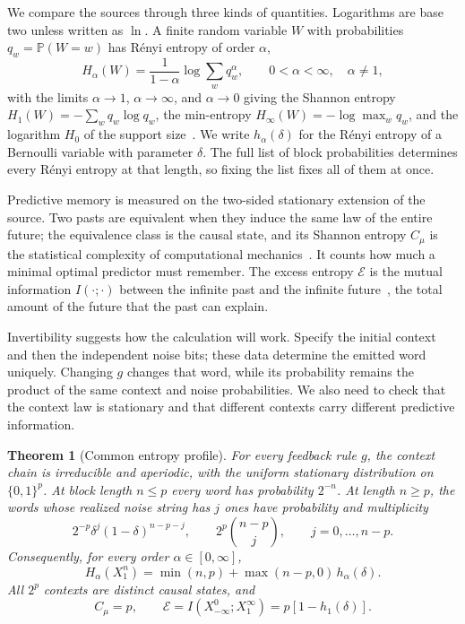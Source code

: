 \documentclass[11pt,a4paper]{article}
\newtheorem{theorem}{Theorem}
\newcommand{\bits}{\{0,1\}}
\newcommand{\PP}{\mathbb{P}}
\begin{document}
We compare the sources through three kinds of quantities. Logarithms are base two unless written as \(\ln\). A finite random variable \(W\) with probabilities \(q_w=\PP(W=w)\) has R\'enyi entropy of order \(\alpha\),
\begin{equation}
H_\alpha(W)=\frac{1}{1-\alpha}\log\sum_w q_w^\alpha,
\qquad 0<\alpha<\infty,\quad\alpha\ne1,
\label{eq:renyi}
\end{equation}
with the limits \(\alpha\to1\), \(\alpha\to\infty\), and \(\alpha\to0\) giving the Shannon entropy \(H_1(W)=-\sum_w q_w\log q_w\), the min-entropy \(H_\infty(W)=-\log\max_w q_w\), and the logarithm \(H_0\) of the support size~\cite{renyi1961measures}. We write \(h_\alpha(\delta)\) for the R\'enyi entropy of a Bernoulli variable with parameter \(\delta\). The full list of block probabilities determines every R\'enyi entropy at that length, so fixing the list fixes all of them at once.

Predictive memory is measured on the two-sided stationary extension of the source. Two pasts are equivalent when they induce the same law of the entire future; the equivalence class is the causal state, and its Shannon entropy \(C_\mu\) is the statistical complexity of computational mechanics~\cite{crutchfield1989inferring,shalizi2001computational}. It counts how much a minimal optimal predictor must remember. The excess entropy \(\mathcal E\) is the mutual information \(I(\cdot;\cdot)\) between the infinite past and the infinite future~\cite{grassberger1986toward,crutchfield2003regularities,bialek2001predictability}, the total amount of the future that the past can explain.

Invertibility suggests how the calculation will work. Specify the initial context and then the independent noise bits; these data determine the emitted word uniquely. Changing \(g\) changes that word, while its probability remains the product of the same context and noise probabilities. We also need to check that the context law is stationary and that different contexts carry different predictive information.

\begin{theorem}[Common entropy profile]
\label{thm:profile}
For every feedback rule \(g\), the context chain is irreducible and aperiodic, with the uniform stationary distribution on \(\bits^p\). At block length \(n\le p\) every word has probability \(2^{-n}\). At length \(n\ge p\), the words whose realized noise string has \(j\) ones have probability and multiplicity
\begin{equation}
2^{-p}\delta^j(1-\delta)^{n-p-j},
\qquad
2^p\binom{n-p}{j},
\qquad j=0,\ldots,n-p.
\label{eq:spectrum}
\end{equation}
Consequently, for every order \(\alpha\in[0,\infty]\),
\begin{equation}
H_\alpha(X_1^n)=\min(n,p)+\max(n-p,0)\,h_\alpha(\delta).
\label{eq:profile}
\end{equation}
All \(2^p\) contexts are distinct causal states, and
\begin{equation}
C_\mu=p,\qquad
\mathcal E=I(X_{-\infty}^{0};X_1^\infty)=p[1-h_1(\delta)].
\label{eq:memory}
\end{equation}
\end{theorem}
\end{document}
